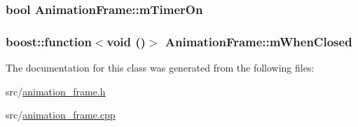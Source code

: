 \hypertarget{a00012_a73516f06167cd8f8cb18d6d9c213196f}{
\subsubsection[{m\-Timer\-On}]{\setlength{\rightskip}{0pt plus 5cm}bool Animation\-Frame\-::m\-Timer\-On\hspace{0.3cm}{\ttfamily [private]}}}\label{a00012_a73516f06167cd8f8cb18d6d9c213196f}
\hypertarget{a00012_aceadfa02d59d86be954eda1e69245465}{
\subsubsection[{m\-When\-Closed}]{\setlength{\rightskip}{0pt plus 5cm}boost\-::function$<$void ()$>$ Animation\-Frame\-::m\-When\-Closed\hspace{0.3cm}{\ttfamily [private]}}}\label{a00012_aceadfa02d59d86be954eda1e69245465}


The documentation for this class was generated from the following files\-:\begin{DoxyCompactItemize}
\item 
src/\hyperlink{a00171}{animation\-\_\-frame.\-h}\item 
src/\hyperlink{a00170}{animation\-\_\-frame.\-cpp}\end{DoxyCompactItemize}
